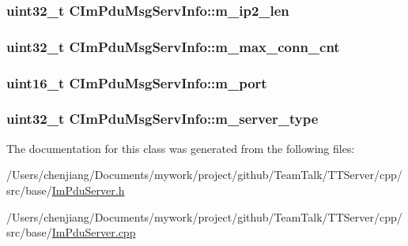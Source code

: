 \subsubsection[{m\+\_\+ip2\+\_\+len}]{\setlength{\rightskip}{0pt plus 5cm}uint32\+\_\+t C\+Im\+Pdu\+Msg\+Serv\+Info\+::m\+\_\+ip2\+\_\+len\hspace{0.3cm}{\ttfamily [private]}}\label{class_c_im_pdu_msg_serv_info_ab2dc4f86aff36ca8402bd2deffe690da}
\hypertarget{class_c_im_pdu_msg_serv_info_a44e1898bd6b18172dbb4c3ac01ca1c8e}{}
\subsubsection[{m\+\_\+max\+\_\+conn\+\_\+cnt}]{\setlength{\rightskip}{0pt plus 5cm}uint32\+\_\+t C\+Im\+Pdu\+Msg\+Serv\+Info\+::m\+\_\+max\+\_\+conn\+\_\+cnt\hspace{0.3cm}{\ttfamily [private]}}\label{class_c_im_pdu_msg_serv_info_a44e1898bd6b18172dbb4c3ac01ca1c8e}
\hypertarget{class_c_im_pdu_msg_serv_info_ace8c9df04e7ecc390df81636efa10432}{}
\subsubsection[{m\+\_\+port}]{\setlength{\rightskip}{0pt plus 5cm}uint16\+\_\+t C\+Im\+Pdu\+Msg\+Serv\+Info\+::m\+\_\+port\hspace{0.3cm}{\ttfamily [private]}}\label{class_c_im_pdu_msg_serv_info_ace8c9df04e7ecc390df81636efa10432}
\hypertarget{class_c_im_pdu_msg_serv_info_acc7c0352af831f16fe196ca8b8460833}{}
\subsubsection[{m\+\_\+server\+\_\+type}]{\setlength{\rightskip}{0pt plus 5cm}uint32\+\_\+t C\+Im\+Pdu\+Msg\+Serv\+Info\+::m\+\_\+server\+\_\+type\hspace{0.3cm}{\ttfamily [private]}}\label{class_c_im_pdu_msg_serv_info_acc7c0352af831f16fe196ca8b8460833}


The documentation for this class was generated from the following files\+:\begin{DoxyCompactItemize}
\item 
/\+Users/chenjiang/\+Documents/mywork/project/github/\+Team\+Talk/\+T\+T\+Server/cpp/src/base/\hyperlink{_im_pdu_server_8h}{Im\+Pdu\+Server.\+h}\item 
/\+Users/chenjiang/\+Documents/mywork/project/github/\+Team\+Talk/\+T\+T\+Server/cpp/src/base/\hyperlink{_im_pdu_server_8cpp}{Im\+Pdu\+Server.\+cpp}\end{DoxyCompactItemize}
